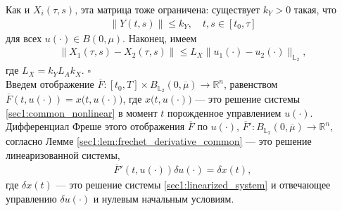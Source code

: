 \documentclass[../main.tex]{subfiles}
\begin{document}
Как и $X_i(\tau,s)$, эта матрица тоже ограничена: существует $k_Y>0$ такая, что
\begin{gather*}
    \|Y(t,s)\| \leqslant k_Y, \quad t,s \in [t_0, \tau]
\end{gather*}
для всех $u(\cdot) \in B(0,\mu)$.
Наконец, имеем 
\begin{gather*}
    \| X_1(\tau,s) - X_2(\tau,s) \| \leqslant L_X \| u_1(\cdot) - u_2(\cdot) \|_{\mathbb{L}_2}, 
\end{gather*} 
где $ L_X = k_Y L_A k_X$.
\hfill$\square$\\[1ex]%
Введем отображение $\overline{F}: [t_0,T]  \times B_{\mathbb{L}_2}(0,\overline{\mu}) \to \mathbb{R}^n$, равенством $\overline{F}(t, u(\cdot)) = x \big(t, u(\cdot)\big) $, где $x \big(t, u(\cdot)\big)$ --- это решение системы \eqref{sec1:common_nonlinear} в момент $t$ порожденное управлением $u(\cdot)$.
Дифференциал Фреше этого отображения $\overline{F}$ по $u(\cdot)$, $\overline{F}': B_{\mathbb{L}_2}(0,\overline{\mu}) \to \mathbb{R}^n $, согласно Лемме \ref{sec1:lem:frechet_derivative_common} --- это решение линеаризованной системы, 
\begin{gather}\label{sec1:diff_of_mapping_F}
    \overline{F}'(t, u(\cdot)) \delta u(\cdot) = \delta x(t), 
\end{gather}
где $\delta x(t)$ --- это решение системы \eqref{sec1:linearized_system} и отвечающее управлению $\delta u(\cdot)$ и нулевым начальным условиям.
    
\end{document}
